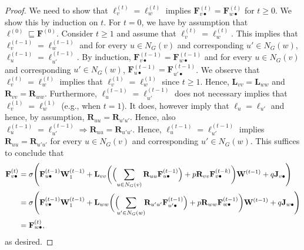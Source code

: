 \begin{proof}
We need to show that $\pmb{\ell}^{(t)}_v=\pmb{\ell}^{(t)}_w$ implies $\mathbf{F}^{(t)}_{v\bullet}=\mathbf{F}^{(t)}_{w\bullet}$ for $t\geq 0$.
We show this by induction on $t$. For $t=0$, we have by assumption that $\pmb{\ell}^{(0)}\sqsubseteq \mathbf{F}^{(0)}$.
 Consider $t\geq 1$ and assume that $\pmb{\ell}^{(t)}_v=\pmb{\ell}^{(t)}_w$. This implies that $\pmb{\ell}^{(t-1)}_v=\pmb{\ell}^{(t-1)}_w$ and for every $u\in N_G(v)$ and corresponding $u'\in N_G(w)$, $\pmb{\ell}^{(t-1)}_u=\pmb{\ell}^{(t-1)}_{u'}$.
By induction, $\mathbf{F}^{(t-1)}_{v\bullet}=\mathbf{F}^{(t-1)}_{w\bullet}$ and for every $u\in N_G(v)$ and corresponding $u'\in N_G(w)$,  $\mathbf{F}^{(t-1)}_{u\bullet}=\mathbf{F}^{(t-1)}_{u'\bullet}$. 
We observe that $\pmb{\ell}^{(t)}_v=\pmb{\ell}^{(t)}_w$ implies that
$\pmb{\ell}^{(1)}_v=\pmb{\ell}^{(1)}_w$ since $t\geq 1$.
Hence,
$\mathbf{L}_{vv}=\mathbf{L}_{ww}$ and $\mathbf{R}_{vv}=\mathbf{R}_{ww}$. Furthermore, 
$\pmb{\ell}^{(t-1)}_u=\pmb{\ell}^{(t-1)}_{u'}$ does not necessary implies that 
$\pmb{\ell}^{(1)}_v=\pmb{\ell}^{(1)}_w$ (e.g., when $t=1$). It does, however imply that
$\pmb{\ell}_u=\pmb{\ell}_{u'}$ and hence, by assumption, $\mathbf{R}_{uu}=\mathbf{R}_{u'u'}$. 
Hence, also $\pmb{\ell}^{(t-1)}_u=\pmb{\ell}^{(t-1)}_{u'}\Rightarrow \mathbf{R}_{uu}=\mathbf{R}_{u'u'}$.
Hence,
$\pmb{\ell}^{(t-1)}_u=\pmb{\ell}^{(t-1)}_{u'}$ implies $\mathbf{R}_{uu}=\mathbf{R}_{u'u'}$ for every $u\in N_G(v)$ and corresponding $u'\in N_G(w)$.
This suffices to conclude that 
  \begin{align*}
	  \mathbf{F}^{(t)}_{v\bullet}&=\sigma\Biggl(\mathbf{F}^{(t-1)}_{u\bullet}\mathbf{W}_1^{(t-1)}+\mathbf{L}_{vv}\biggl(\Bigl(\sum_{u\in N_G(v)} \mathbf{R}_{uu}\mathbf{F}^{(t-1)}_{u\bullet}\Bigr)+p\mathbf{R}_{vv}\mathbf{F}^{(t-k)}_{v\bullet}\biggr)\mathbf{W}^{(t-1)}+ q\mathbf{J}_{v\bullet}\Biggr)\\
	 & =\sigma\Biggl(\mathbf{F}^{(t-1)}_{v\bullet}\mathbf{W}_1^{(t-1)}+\mathbf{L}_{ww}\biggl(\Bigl(\!\!\sum_{u'\in N_G(w)}\!\! \mathbf{R}_{u'u'}\mathbf{F}^{(t-1)}_{u'\bullet}\Bigr)+p\mathbf{R}_{ww}\mathbf{F}^{(t-1)}_{w\bullet}\biggr)\mathbf{W}^{(t-1)}+ q\mathbf{J}_{w\bullet}\Biggr)\\
	  &=\mathbf{F}^{(t)}_{w\bullet},
\end{align*}
as desired.
\end{proof}

